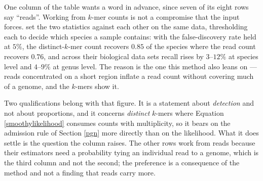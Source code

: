 \documentclass[pdflatex,sn-vancouver-num]{sn-jnl}
\begin{document}
    One column of the table wants a word in advance, since seven of its eight rows say
    \enquote{reads}. Working from $k$-mer counts is not a compromise that the input forces.
    \citet{krakenuniq} set the two statistics against each other on the same data, thresholding each
    to decide which species a sample contains: with the false-discovery rate held at $5\%$, the
    distinct-$k$-mer count recovers $0.85$ of the species where the read count recovers $0.76$, and
    across their biological data sets recall rises by $3$--$12\%$ at species level and $4$--$9\%$ at
    genus level. The reason is the one this method also leans on --- reads concentrated on a short
    region inflate a read count without covering much of a genome, and the $k$-mers show it.

    Two qualifications belong with that figure. It is a statement about \emph{detection} and not
    about proportions, and it concerns \emph{distinct} $k$-mers where
    Equation \eqref{smoothylikelihood} consumes counts with multiplicity, so it bears on the admission
    rule of Section \ref{pgn} more directly than on the likelihood. What it does settle is the
    question the column raises. The other rows work from reads because their estimators need a
    probability tying an individual read to a genome, which is the third column and not the second;
    the preference is a consequence of the method and not a finding that reads carry more.
\end{document}
